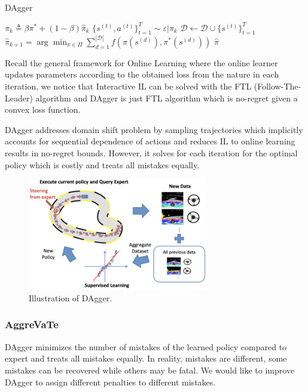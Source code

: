 \documentclass[11pt]{article}
\begin{document}
\begin{algorithm}[H]
\caption{DAgger}
\label{algo:dagger}
\begin{algorithmic}[1]
\STATE $\pi_k \triangleq \beta\pi^* + (1-\beta)\hat{\pi}_k$
\STATE $\{s^{(t)},a^{(t)}\}_{t=1}^T\sim\varepsilon|\pi_k$
\STATE $\mathcal{D}\leftarrow\mathcal{D}\cup\{s^{(t)}\}_{t=1}^T$
\STATE $\hat{\pi}_{k+1}=\arg\min_{\pi\in\Pi}\sum_{d=1}^{|\mathcal{D}|}f(\pi(s^{(d)}),\pi^*(s^{(d)}))$
\ENDFOR
\RETURN $\hat{\pi}$
\end{algorithmic}
\end{algorithm}

Recall the general framework for Online Learning where the online learner updates parameters according to the obtained loss from the nature in each iteration, we notice that Interactive IL can be solved with the FTL (Follow-The-Leader) algorithm and DAgger is just FTL algorithm which is no-regret given a convex loss function. 

DAgger addresses domain shift problem by sampling trajectories which implicitly accounts for sequential dependence of actions and reduces IL to online learning results in no-regret bounds. However, it solves for each iteration for the optimal policy which is costly and treats all mistakes equally.

\begin{figure}[H]
    \centering
    \includegraphics[width=0.7\textwidth]{images/DAgger.png}
    \caption{Illustration of DAgger.}
    \label{f_dagger}
\end{figure}

\subsubsection{AggreVaTe}
DAgger minimizes the number of mistakes of the learned policy compared to expert and treats all mistakes equally. In reality, mistakes are different, some mistakes can be recovered while others may be fatal. We would like to improve DAgger to assign different penalties to different mistakes. 
\end{document}
